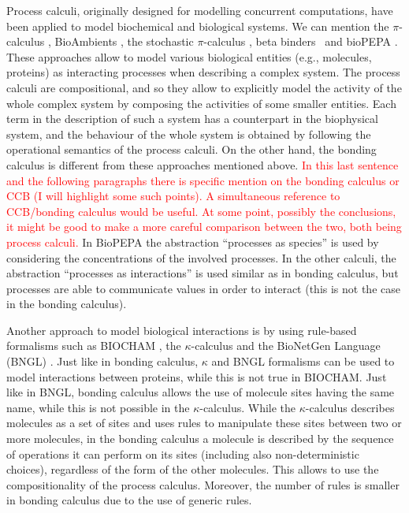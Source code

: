 \documentclass[runningheads]{llncs}
\newcommand\anna[1]{\textcolor{red}{#1}}
\begin{document}
Process calculi, originally designed for modelling concurrent computations, have been applied to model biochemical and biological systems. We can mention the $\pi$-calculus \cite{MilnerPi,Regev2004}, BioAmbients \cite{RegevBioambients}, the stochastic $\pi$-calculus \cite{PriamiStochasticPi}, beta binders~\cite{betabinders} and bioPEPA \cite{CiocchettaBiopepa}. These approaches allow to model various biological entities (e.g., molecules, proteins) as interacting processes when describing a complex system. The process calculi are compositional, and so they allow to explicitly model the activity of the whole complex system by composing the activities of some smaller entities. Each term in the description of such a system has a counterpart in the biophysical system, and the behaviour of the whole system is obtained by following the operational semantics of the process calculi. On the other hand, the bonding calculus \cite{NaCo18} is different from these approaches mentioned above.  \anna{In this last sentence and the following paragraphs there is specific mention on the bonding calculus or CCB (I will highlight some such points). A simultaneous reference to CCB/bonding calculus would be useful. At some point, possibly the conclusions, it might be good to make a more careful comparison between the two, both being process calculi.} In BioPEPA the abstraction ``processes as species'' is used by considering the concentrations of the involved processes. In the other calculi,  the abstraction ``processes as interactions'' is used similar as in bonding calculus, but processes are able to communicate values in order to interact (this is not the case in the bonding calculus). 


Another approach to model biological interactions is by using rule-based formalisms such as BIOCHAM \cite{biocham}, the $\kappa$-calculus  \cite{danoscausality} and the BioNetGen Language (BNGL) \cite{pmid19399430}. Just like in bonding calculus, $\kappa$ and BNGL formalisms can be used to model interactions between proteins, while this is not true in BIOCHAM. Just like in BNGL, bonding calculus allows the use of molecule sites having the same name, while this is not possible in the $\kappa$-calculus. While the $\kappa$-calculus describes molecules as a set of sites and uses rules to manipulate these sites between two or more molecules, in the  bonding calculus \cite{NaCo18} a molecule is described by the sequence of operations it can perform on its sites (including also non-deterministic choices), regardless of the form of the other molecules. This allows to use the compositionality of the process calculus. Moreover, the number of rules is smaller in bonding calculus due to the use of generic rules.
\end{document}
